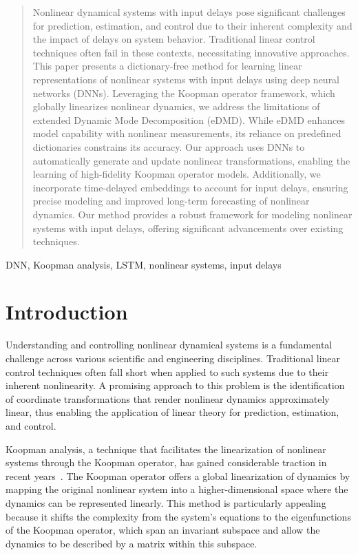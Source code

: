 \documentclass[conference]{IEEEtran}
\begin{document}
\begin{abstract}
    Nonlinear dynamical systems with input delays pose significant challenges for prediction, estimation, and control due to their inherent complexity and the impact of delays on system behavior. Traditional linear control techniques often fail in these contexts, necessitating innovative approaches. This paper presents a dictionary-free method for learning linear representations of nonlinear systems with input delays using deep neural networks (DNNs). Leveraging the Koopman operator framework, which globally linearizes nonlinear dynamics, we address the limitations of extended Dynamic Mode Decomposition (eDMD). While eDMD enhances model capability with nonlinear measurements, its reliance on predefined dictionaries constrains its accuracy. Our approach uses DNNs to automatically generate and update nonlinear transformations, enabling the learning of high-fidelity Koopman operator models. Additionally, we incorporate time-delayed embeddings to account for input delays, ensuring precise modeling and improved long-term forecasting of nonlinear dynamics. Our method provides a robust framework for modeling nonlinear systems with input delays, offering significant advancements over existing techniques.
\end{abstract}

\begin{IEEEkeywords}
    DNN, Koopman analysis, LSTM, nonlinear systems, input delays
\end{IEEEkeywords}

\section{Introduction}
Understanding and controlling nonlinear dynamical systems is a fundamental challenge across various scientific and engineering disciplines. Traditional linear control techniques often fall short when applied to such systems due to their inherent nonlinearity. A promising approach to this problem is the identification of coordinate transformations that render nonlinear dynamics approximately linear, thus enabling the application of linear theory for prediction, estimation, and control.

Koopman analysis, a technique that facilitates the linearization of nonlinear systems through the Koopman operator, has gained considerable traction in recent years~\cite{Mezic2004101, Mezić2005}. The Koopman operator offers a global linearization of dynamics by mapping the original nonlinear system into a higher-dimensional space where the dynamics can be represented linearly. This method is particularly appealing because it shifts the complexity from the system's equations to the eigenfunctions of the Koopman operator, which span an invariant subspace and allow the dynamics to be described by a matrix within this subspace.
\end{document}
